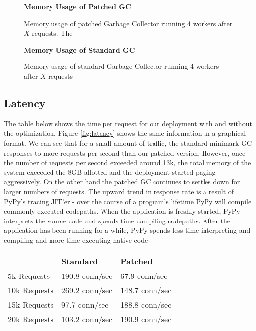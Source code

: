 \documentclass{article}
\begin{document}
\begin{figure}\label{fig:patched_mem}
    \begin{center}\textbf{Memory Usage of Patched GC}\end{center}
    \resizebox{0.5\textwidth}{!}{}
    \caption{Memory usage of patched Garbage Collector running 4 workers after $X$ requests.  The }
\end{figure}

\begin{figure}\label{fig:standard_mem}
    \begin{center}\textbf{Memory Usage of Standard GC}\end{center}
    \resizebox{0.5\textwidth}{!}{}
    \caption{Memory usage of standard Garbage Collector running 4 workers after $X$ requests}
\end{figure}

\subsection{Latency}

The table below shows the time per request for our deployment with and without the optimization.  Figure \ref{fig:latency} shows the same information in a graphical format.  We can see that for a small amount of traffic, the standard minimark GC responses to more requests per second than our patched version.  However, once the number of requests per second exceeded around 13k, the total memory of the system exceeded the 8GB allotted and the deployment started paging aggressively.  On the other hand the patched GC continues to settles down for larger numbers of requests.  The upward trend in response rate is a result of PyPy's tracing JIT'er - over the course of a program's lifetime PyPy will compile commonly executed codepaths.  When the application is freshly started, PyPy interprets the source code and spends time compiling codepaths.  After the application has been running for a while, PyPy spends less time interpreting and compiling and more time executing native code \cite{pypy-doc}

\begin{center}
\begin{tabular}{| l || l | l |}
    \hline
     & \textbf{Standard} & \textbf{Patched} \\
    \hline
    5k Requests & 190.8 conn/sec & 67.9 conn/sec \\
    10k Requests & 269.2 conn/sec & 148.7 conn/sec \\
    15k Requests & 97.7 conn/sec & 188.8 conn/sec \\
    20k Requests & 103.2 conn/sec & 190.9 conn/sec \\
    \hline
\end{tabular}
\end{center}
\end{document}
